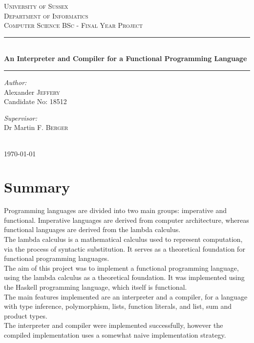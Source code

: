 \documentclass{article}
\begin{document}
\begin{titlepage}
    \center
    \textsc{\LARGE University of Sussex} \\
    \vspace{16mm}
    \textsc{\Large Department of Informatics} \\
    \vspace{4mm}
    \textsc{\large Computer Science BSc - Final Year Project} \\
    \vspace{8mm}
    \rule{\linewidth}{0.5mm}\\
    \vspace{2mm}
    {\huge \bfseries An Interpreter and Compiler for a Functional Programming Language}
    \rule{\linewidth}{0.5mm}
    \begin{minipage}{0.4\textwidth}
        \vspace{10mm}
        \begin{flushleft}
            \emph{Author:} \\
            Alexander \textsc{Jeffery} \\
            Candidate No: \textsc{18512}
        \end{flushleft}
    \end{minipage}
    \begin{minipage}{0.4\textwidth}
        \vspace{10mm}
        \begin{flushright}
            \emph{Supervisor:} \\
            Dr Martin F. \textsc{Berger}
        \end{flushright}
    \end{minipage} \\
    \vspace{10mm}
    {\large \today}
    \vfill
\end{titlepage}

\section*{Summary}
Programming languages are divided into two main groups: imperative and functional. Imperative languages are derived from computer architecture, whereas functional languages are derived from the lambda calculus.
\\\indent The lambda calculus is a mathematical calculus used to represent computation, via the process of syntactic substitution. It serves as a theoretical foundation for functional programming languages.
\\\indent The aim of this project was to implement a functional programming language, using the lambda calculus as a theoretical foundation. It was implemented using the Haskell programming language, which itself is functional.
\\\indent The main features implemented are an interpreter and a compiler, for a language with type inference, polymorphism, lists, function literals, and list, sum and product types.
\\\indent The interpreter and compiler were implemented successfully, however the compiled implementation uses a somewhat naive implementation strategy.
\pagebreak
\end{document}
